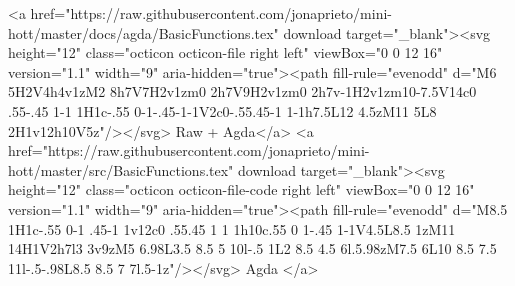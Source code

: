 {        <a href="https://raw.githubusercontent.com/jonaprieto/mini-hott/master/docs/agda/BasicFunctions.tex" download target="_blank"><svg height="12" class="octicon octicon-file right left" viewBox="0 0 12 16" version="1.1" width="9" aria-hidden="true"><path fill-rule="evenodd" d="M6 5H2V4h4v1zM2 8h7V7H2v1zm0 2h7V9H2v1zm0 2h7v-1H2v1zm10-7.5V14c0 .55-.45 1-1 1H1c-.55 0-1-.45-1-1V2c0-.55.45-1 1-1h7.5L12 4.5zM11 5L8 2H1v12h10V5z"/></svg> Raw + Agda</a>
        <a href="https://raw.githubusercontent.com/jonaprieto/mini-hott/master/src/BasicFunctions.tex" download target="_blank"><svg height="12" class="octicon octicon-file-code right left" viewBox="0 0 12 16" version="1.1" width="9" aria-hidden="true"><path fill-rule="evenodd" d="M8.5 1H1c-.55 0-1 .45-1 1v12c0 .55.45 1 1 1h10c.55 0 1-.45 1-1V4.5L8.5 1zM11 14H1V2h7l3 3v9zM5 6.98L3.5 8.5 5 10l-.5 1L2 8.5 4.5 6l.5.98zM7.5 6L10 8.5 7.5 11l-.5-.98L8.5 8.5 7 7l.5-1z"/></svg> Agda </a>
      
}
